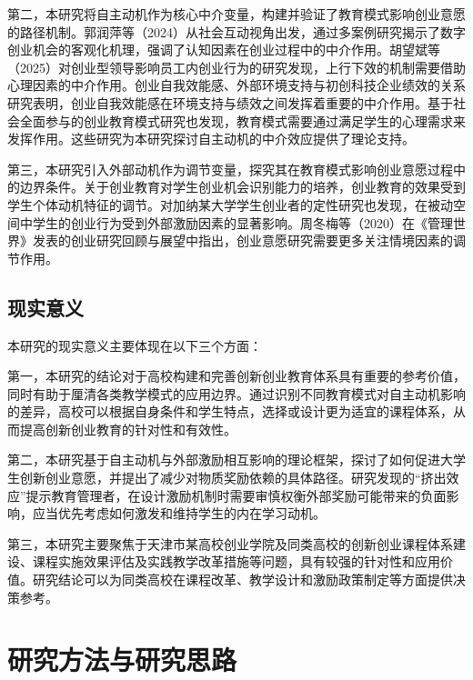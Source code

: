 第二，本研究将自主动机作为核心中介变量，构建并验证了教育模式影响创业意愿的路径机制。郭润萍等\nolinebreak[3]（2024）从社会互动视角出发，通过多案例研究揭示了数字创业机会的客观化机理，强调了认知因素在创业过程中的中介作用\cite{guorunping2024}。胡望斌等\nolinebreak[3]（2025）对创业型领导影响员工内创业行为的研究发现，上行下效的机制需要借助心理因素的中介作用\cite{huwangbin2025}。创业自我效能感、外部环境支持与初创科技企业绩效的关系研究\cite{nankai2007}表明，创业自我效能感在环境支持与绩效之间发挥着重要的中介作用。基于社会全面参与的创业教育模式研究\cite{guanlixuebao2011}也发现，教育模式需要通过满足学生的心理需求来发挥作用。这些研究为本研究探讨自主动机的中介效应提供了理论支持。

第三，本研究引入外部动机作为调节变量，探究其在教育模式影响创业意愿过程中的边界条件。关于创业教育对学生创业机会识别能力的培养，创业教育的效果受到学生个体动机特征的调节\cite{EEP2025a}。对加纳某大学学生创业者的定性研究也发现，在被动空间中学生的创业行为受到外部激励因素的显著影响\cite{EEP2025b}。周冬梅等\nolinebreak[3]（2020）在\nolinebreak[3]《管理世界》发表的创业研究回顾与展望中指出，创业意愿研究需要更多关注情境因素的调节作用\cite{zhoudongmei2020}。

\subsection{现实意义}

本研究的现实意义主要体现在以下三个方面：

第一，本研究的结论对于高校构建和完善创新创业教育体系具有重要的参考价值，同时有助于厘清各类教学模式的应用边界。通过识别不同教育模式对自主动机影响的差异，高校可以根据自身条件和学生特点，选择或设计更为适宜的课程体系，从而提高创新创业教育的针对性和有效性。

第二，本研究基于自主动机与外部激励相互影响的理论框架，探讨了如何促进大学生创新创业意愿，并提出了减少对物质奖励依赖的具体路径。研究发现的\nolinebreak[3]“挤出效应”提示教育管理者，在设计激励机制时需要审慎权衡外部奖励可能带来的负面影响，应当优先考虑如何激发和维持学生的内在学习动机。

第三，本研究主要聚焦于天津市某高校创业学院及同类高校的创新创业课程体系建设、课程实施效果评估及实践教学改革措施等问题，具有较强的针对性和应用价值。研究结论可以为同类高校在课程改革、教学设计和激励政策制定等方面提供决策参考。

\section{研究方法与研究思路}

